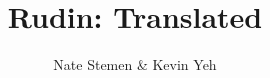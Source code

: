 \documentclass{tufte-book}
\title{Rudin: Translated}
\author{Nate Stemen \& Kevin Yeh}
\begin{document}
\frontmatter
\maketitle
\tableofcontents
\listoftodos

\mainmatter


\printbibliography
\end{document}
